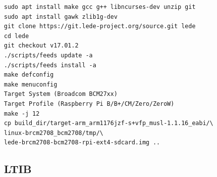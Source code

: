 \documentclass[printmode]{mgr}
\begin{document}
\begin{lstlisting}
sudo apt install make gcc g++ libncurses-dev unzip git
sudo apt install gawk zlib1g-dev
git clone https://git.lede-project.org/source.git lede
cd lede
git checkout v17.01.2
./scripts/feeds update -a
./scripts/feeds install -a
make defconfig
make menuconfig
Target System (Broadcom BCM27xx)
Target Profile (Raspberry Pi B/B+/CM/Zero/ZeroW)
make -j 12
cp build_dir/target-arm_arm1176jzf-s+vfp_musl-1.1.16_eabi/\
linux-brcm2708_bcm2708/tmp/\
lede-brcm2708-bcm2708-rpi-ext4-sdcard.img ..
\end{lstlisting}



\subsection{LTIB}



%


\end{document}
